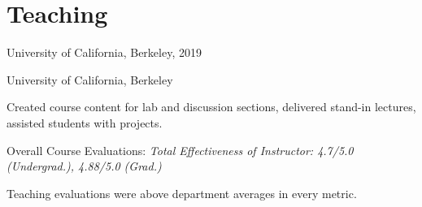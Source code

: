 \documentclass[letterpaper]{deedy-resume} %
\begin{document}
{\section{Teaching}

\vspace{0.2cm}

\begin{etaremune}

\item {{} University of California, Berkeley, 2019}


\item {{} University of California, Berkeley
 
\vspace{0.1cm}
\begin{tightitemize}
\item Created course content for lab and discussion sections, delivered stand-in lectures, assisted students with projects.
\item Overall Course Evaluations: {\it Total Effectiveness of Instructor: 4.7/5.0 (Undergrad.), 4.88/5.0 (Grad.)}
\item Teaching evaluations were above department averages in every metric.
\end{tightitemize}}

\end{etaremune}


  




}
\end{document}
